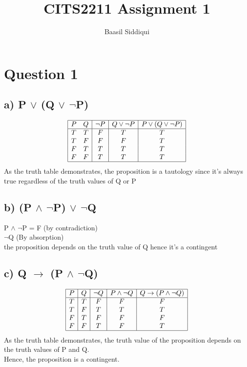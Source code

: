 \documentclass[11pt]{article}
\title{\textbf{CITS2211 Assignment 1}}
\author{Baasil Siddiqui}
\date{}
\begin{document}
\parskip 2mm
\maketitle
\thispagestyle{empty}

\section*{Question 1}

\subsection*{a) P $\lor$ (Q $\lor$ $\neg$P)}

\begin{displaymath}
    \begin{array}{|c c| c | c | c |}
        \hline
        P & Q & \neg P & Q \lor \neg P & P \lor (Q \lor \neg P)\\
        \hline
        T & T & F & T & T\\
        T & F & F & F & T\\
        F & T & T & T & T\\
        F & F & T & T & T\\
        \hline
    \end{array}
\end{displaymath}
%
As the truth table demonstrates, the proposition is a tautology since
it's always true regardless of the truth values of Q or P


\subsection*{b) (P $\land$ $\neg$P) $\lor$ $\neg$Q}

P $\land$ $\neg$P = F (by contradiction)\\
$\neg$Q \hspace{36pt} (By absorption)\\
\newline
the proposition depends on the truth value of Q hence it's a contingent


\subsection*{c) Q $\rightarrow$ (P $\land$ $\neg$Q)}

\begin{displaymath}
    \begin{array}{|c|c|c|c|c|}
        \hline
        P & Q & \neg Q & P \land \neg Q & Q \rightarrow (P \land \neg Q) \\
        \hline
        T & T & F & F & F \\
        T & F & T & T & T \\
        F & T & F & F & F \\
        F & F & T & F & T \\
        \hline
    \end{array}
\end{displaymath}
%
As the truth table demonstrates, the truth value of the proposition depends on
the truth values of P and Q.\\
Hence, the proposition is a contingent.
\end{document}
